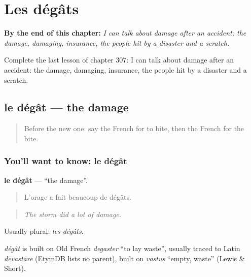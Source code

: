 
\chapter{Les dégâts}
\label{ch:fr-les-degats}

\begin{chapteropening}
\textbf{By the end of this chapter:} \emph{I can talk about damage after an accident: the damage, damaging, insurance, the people hit by a disaster and a scratch.}

Complete the last lesson of chapter 307: I can talk about damage after an accident: the damage, damaging, insurance, the people hit by a disaster and a scratch.
\end{chapteropening}

\section[le dégât]{le dégât — the damage}

\label{lesson:FR-C307-degat}



\begin{quote}
Before the new one: say the French for to bite, then the French for the bite.
\end{quote}

\subsection*{You'll want to know: le dégât}
\textbf{le dégât} — \textquotedblleft{}the damage\textquotedblright{}.

\begin{quote}
L'orage a fait beaucoup de dégâts.
\end{quote}

\begin{quote}
\emph{The storm did a lot of damage.}
\end{quote}

Usually plural: \emph{les dégâts}.

\begin{cousinweb}
\emph{dégât} is built on Old French \emph{degaster} \textquotedblleft{}to lay waste\textquotedblright{}, usually traced to Latin \emph{dēvastāre} (EtymDB lists no parent), built on \emph{vastus} \textquotedblleft{}empty, waste\textquotedblright{} (Lewis \& Short).
\end{cousinweb}

